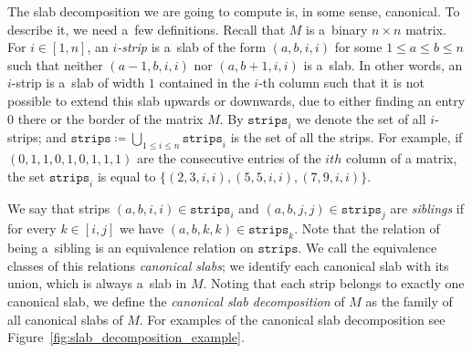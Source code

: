 \documentclass[runningheads]{llncs}
\renewcommand{\leq}{\leqslant}
\begin{document}
\newcommand{\strips}{\mathtt{strips}}

The slab decomposition we are going to compute is, in some sense, canonical. To describe it, we need a~few definitions. Recall that $M$ is a~binary $n\times n$ matrix. For $i\in [1,n]$, an {\em{$i$-strip}} is a~slab of the form $(a,b,i,i)$ for some $1\leq a\leq b\leq n$ such that neither $(a-1,b,i,i)$ nor $(a,b+1,i,i)$ is a~slab. In other words, an $i$-strip is a~slab of width $1$ contained in the $i$-th column such that it is not possible to extend this slab upwards or downwards, due to either finding an entry $0$ there or the border of the matrix $M$. 
By $\strips_i$ we denote the set of all $i$-strips; and $\strips\coloneqq \bigcup_{1\leq i\leq n} \strips_i$ is the set of all the strips. For example, if $(0, 1, 1, 0, 1, 0, 1, 1, 1)$ are the consecutive entries of the $ith$ column of a matrix, the set $\strips_i$ is equal to $\{(2,3,i,i), (5,5, i, i), (7,9, i,i)\}$.

We say that strips $(a,b,i,i)\in \strips_i$ and $(a,b,j,j)\in \strips_j$ are {\em{siblings}} if for every $k\in [i,j]$ we have $(a,b,k,k)\in \strips_k$.
Note that the relation of being a~sibling is an equivalence relation on $\strips$. We call the equivalence classes of this relations {\em{canonical slabs}}; we identify each canonical slab with its union, which is always a~slab in $M$. Noting that each strip belongs to exactly one canonical slab, we define the {\em{canonical slab decomposition}} of $M$ as the family of all canonical slabs of $M$. For examples of the canonical slab decomposition see Figure~\ref{fig:slab_decomposition_example}.
\end{document}
